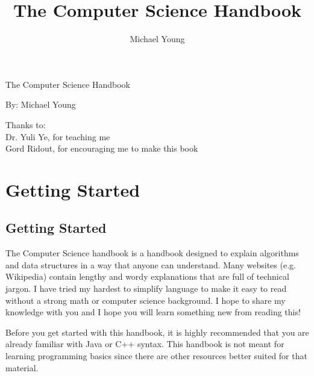 \documentclass[11pt,oneside]{book}
\title{The Computer Science Handbook}
\author{Michael Young}
\begin{document}
  \begin{titlepage}
  \vspace*{\fill}
  \begin{center}
  \LARGE\textsf{The Computer Science Handbook}\par
  \end{center}
  \begin{center}
  \textsf{By: Michael Young}\par
  \end{center}
  \vspace*{\fill}
  \end{titlepage}
  
  \maketitle

  \frontmatter
  
  \vspace*{\fill}
  \begin{center}
  Thanks to: \\
  Dr. Yuli Ye, for teaching me\\
  Gord Ridout, for encouraging me to make this book\\
  \end{center}
  \vspace*{\fill}

  \mainmatter

  \tableofcontents
  \chapter{ Getting Started }
    \section{ Getting Started }
    

The Computer Science handbook is a handbook designed to explain algorithms and data structures in a way that anyone can understand. Many websites (e.g. Wikipedia) contain lengthy and wordy explanations that are full of technical jargon. I have tried my hardest to simplify language to make it easy to read without a strong math or computer science background. I hope to share my knowledge with you and I hope you will learn something new from reading this!

Before you get started with this handbook, it is highly recommended that you are already familiar with Java or C++ syntax. This handbook is not meant for learning programming basics since there are other resources better suited for that material.
\end{document}

